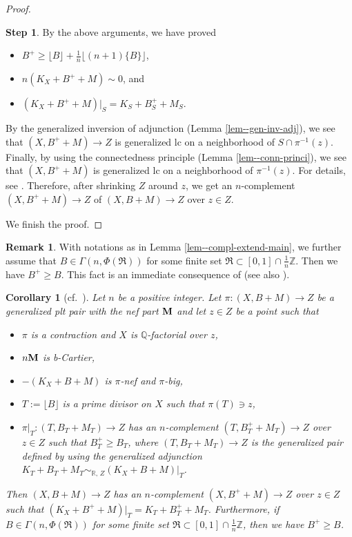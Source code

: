 \documentclass[12pt]{amsart}
\newtheorem{cor}[thm]{Corollary}
\theoremstyle{definition}
\newtheorem{rem}[thm]{Remark}
\newtheorem{step1}{Step}
\begin{document}
\begin{proof}
\begin{step1}
By the above arguments, we have proved 
\begin{itemize}
\item
$B^{+} \geq \lfloor B \rfloor+\frac{1}{n}\lfloor (n+1)\{B\}\rfloor$, 
\item
$n(K_{X}+B^{+}+M) \sim0$, and
\item
$(K_{X}+B^{+}+M)|_{S}=K_{S}+B^{+}_{S}+M_{S}$. 
\end{itemize}
By the generalized inversion of adjunction (Lemma \ref{lem--gen-inv-adj}), we see that $(X,B^{+}+M)\to Z$ is generalized lc on a neighborhood of $S \cap \pi^{-1}(z)$. 
Finally, by using the connectedness principle (Lemma \ref{lem--conn-princi}), we see that $(X,B^{+}+M)$ is generalized lc on a neighborhood of $\pi^{-1}(z)$. 
For details, see \cite[Step 9 in the proof of Proposition 8.1]{birkar-compl}. 
Therefore, after shrinking $Z$ around $z$, we get an $n$-complement $(X,B^{+}+M) \to Z$ of $(X,B+M) \to Z$ over $z \in Z$. 
\end{step1}
We finish the proof. 
\end{proof}


\begin{rem}\label{rem--monotonic-compl}
With notations as in Lemma \ref{lem--compl-extend-main}, we further assume that $B \in \Gamma(n, \Phi(\mathfrak{R}))$ for some finite set $\mathfrak{R} \subset [0,1]\cap \frac{1}{n}\mathbb{Z}$. 
Then we have $B^{+}\geq B$. 
This fact is an immediate consequence of \cite[Lemma 2.3]{chx-compl} (see also \cite[Lemma 2.20]{chhx-compl}). 
\end{rem}


\begin{cor}[cf.~{\cite[Proposition 3.5, Remark 3.6]{chhx-compl}}]\label{cor--compl-extend-1}
Let $n$ be a positive integer. 
Let $\pi \colon (X,B+M) \to Z$ be a generalized plt pair with the nef part $\boldsymbol{\rm M}$ and let $z \in Z$ be a point such that
\begin{itemize}
\item
$\pi$ is a contraction and $X$ is $\mathbb{Q}$-factorial over $z$, 
\item
$n\boldsymbol{\rm M}$ is b-Cartier, 
\item
$-(K_{X}+B+M)$ is $\pi$-nef and $\pi$-big, 
\item
$T:=\lfloor B \rfloor$ is a prime divisor on $X$ such that $\pi(T) \ni z$, 
\item
$\pi|_{T}\colon(T,B_{T}+M_{T}) \to Z$ has an $n$-complement $(T,B^{+}_{T}+M_{T}) \to Z$ over $z \in Z$ such that $B^{+}_{T} \geq B_{T}$, where $(T,B_{T}+M_{T}) \to Z$ is the generalized pair defined by using the generalized adjunction $K_{T}+B_{T}+M_{T}\sim_{\mathbb{R},\,Z}(K_{X}+B+M)|_{T}$. 
\end{itemize}
Then $(X,B+M) \to Z$ has an $n$-complement $(X,B^{+}+M) \to Z$ over $z \in Z$ such that $(K_{X}+B^{+}+M)|_{T}=K_{T}+B^{+}_{T}+M_{T}$. 
Furthermore, if $B \in \Gamma(n, \Phi(\mathfrak{R}))$ for some finite set $\mathfrak{R} \subset [0,1]\cap \frac{1}{n}\mathbb{Z}$, then we have $B^{+}\geq B$. 
\end{cor}
\end{document}
